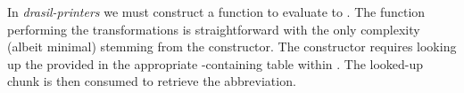 %
%
%

In \textit{drasil-printers} we must construct a function to evaluate  to . The function performing the transformations is straightforward with the only complexity (albeit minimal) stemming from the  constructor. The  constructor requires looking up the provided  in the appropriate -containing table within . The looked-up chunk is then consumed to retrieve the abbreviation. 

%
%
%

